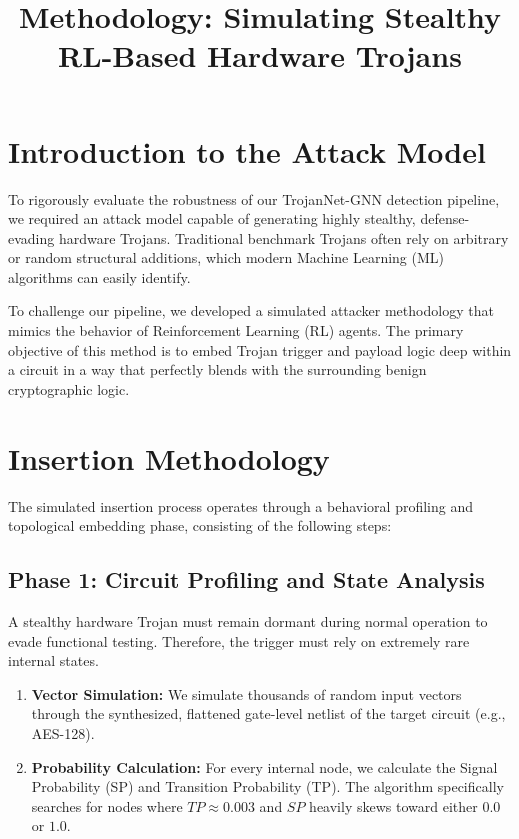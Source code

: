 \documentclass[12pt]{article}
\title{\textbf{Methodology: Simulating Stealthy RL-Based Hardware Trojans}}
\author{}
\date{}
\begin{document}
\maketitle

\section{Introduction to the Attack Model}
To rigorously evaluate the robustness of our TrojanNet-GNN detection pipeline, we required an attack model capable of generating highly stealthy, defense-evading hardware Trojans. Traditional benchmark Trojans often rely on arbitrary or random structural additions, which modern Machine Learning (ML) algorithms can easily identify. 

To challenge our pipeline, we developed a simulated attacker methodology that mimics the behavior of Reinforcement Learning (RL) agents. The primary objective of this method is to embed Trojan trigger and payload logic deep within a circuit in a way that perfectly blends with the surrounding benign cryptographic logic.

\section{Insertion Methodology}
The simulated insertion process operates through a behavioral profiling and topological embedding phase, consisting of the following steps:

\subsection{Phase 1: Circuit Profiling and State Analysis}
A stealthy hardware Trojan must remain dormant during normal operation to evade functional testing. Therefore, the trigger must rely on extremely rare internal states. 
\begin{enumerate}
    \item \textbf{Vector Simulation:} We simulate thousands of random input vectors through the synthesized, flattened gate-level netlist of the target circuit (e.g., AES-128).
    \item \textbf{Probability Calculation:} For every internal node, we calculate the Signal Probability (SP) and Transition Probability (TP). The algorithm specifically searches for nodes where $TP \approx 0.003$ and $SP$ heavily skews toward either $0.0$ or $1.0$.
\end{enumerate}
\end{document}
